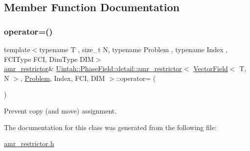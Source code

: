 \subsection{Member Function Documentation}
\mbox{\label{classUintah_1_1PhaseField_1_1detail_1_1amr__restrictor_3_01VectorField_3_01T_00_01N_01_4_00_01Pre7f2e99a4fbf25ff00717d25c8580b1a_a8a66e1c425c67a41925ea9714816d586}} 
\subsubsection{\texorpdfstring{operator=()}{operator=()}}
{\footnotesize\ttfamily template$<$typename T , size\+\_\+t N, typename Problem , typename Index , F\+C\+I\+Type F\+CI, Dim\+Type D\+IM$>$ \\
\hyperlink{classUintah_1_1PhaseField_1_1detail_1_1amr__restrictor}{amr\+\_\+restrictor}\& \hyperlink{classUintah_1_1PhaseField_1_1detail_1_1amr__restrictor}{Uintah\+::\+Phase\+Field\+::detail\+::amr\+\_\+restrictor}$<$ \hyperlink{structUintah_1_1PhaseField_1_1VectorField}{Vector\+Field}$<$ T, N $>$, \hyperlink{classUintah_1_1PhaseField_1_1Problem}{Problem}, Index, F\+CI, D\+IM $>$\+::operator= (\begin{DoxyParamCaption}\item[{const \hyperlink{classUintah_1_1PhaseField_1_1detail_1_1amr__restrictor}{amr\+\_\+restrictor}$<$ \hyperlink{structUintah_1_1PhaseField_1_1VectorField}{Vector\+Field}$<$ T, N $>$, \hyperlink{classUintah_1_1PhaseField_1_1Problem}{Problem}, Index, F\+CI, D\+IM $>$ \&}]{ }\end{DoxyParamCaption})\hspace{0.3cm}{\ttfamily [delete]}}



Prevent copy (and move) assignment. 



The documentation for this class was generated from the following file\+:\begin{DoxyCompactItemize}
\item 
\hyperlink{amr__restrictor_8h}{amr\+\_\+restrictor.\+h}\end{DoxyCompactItemize}
